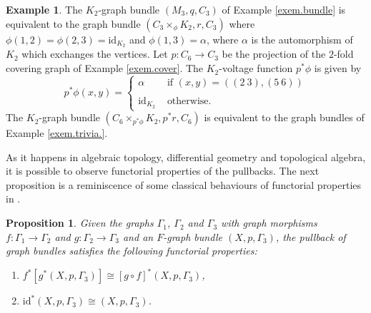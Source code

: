 \documentclass{amsart}
\newtheorem{prop}[theo]{Proposition}
\theoremstyle{definition}
\newtheorem{example}[theo]{Example}
\numberwithin{equation}{section}
\begin{document}
\begin{example}\label{exem.pullb}
The $K_2$-graph bundle $(M_3, q, C_3)$  of Example \ref{exem.bundle} is equivalent to the graph bundle $(C_3 \times_\phi K_2, r, C_3)$ where $\phi(1,2) = \phi(2,3) = \mathrm{id}_{K_2}$ and $\phi(1,3) = \alpha$, where $\alpha$ is the automorphism of $K_2$ which exchanges the vertices. Let $p : C_6 \longrightarrow C_3$ be the projection of the $2$-fold covering graph of Example \ref{exem.cover}. The $K_2$-voltage function $p^*\phi$ is given by
\begin{equation}
    p^*\phi(x,y) = \begin{cases}
        \alpha & \mbox{   if   } (x,y) = ((2  \ 3) , (5 \ 6)) \\
        \\
        \mathrm{id}_{K_2} & \mbox{ otherwise.}
    \end{cases}
\end{equation}
The $K_2$-graph bundle $(C_6 \times_{p^* \phi} K_2, p^* r, C_6)$ is equivalent to the graph bundles of Example \ref{exem.trivia.}.
\end{example}



As it happens in algebraic topology, differential geometry and topological algebra, it is possible to observe  functorial properties of the pullbacks. The next proposition is a reminiscence of some classical behaviours of functorial properties in \cite[Propositions A3.33, A3.35, A3.36, Theorems A3.52, Lemma A3.59, Theorem A3.60]{hofmor}.

\begin{prop}\label{funct}
Given the  graphs $\Gamma_1$, $\Gamma_2$ and $\Gamma_3$ with graph morphisms $f: \Gamma_1 \longrightarrow \Gamma_2$ and $g: \Gamma_2 \longrightarrow \Gamma_3$ and  an $F$-graph bundle $(X, p, \Gamma_3)$, the pullback of graph bundles satisfies the following functorial properties: 
\begin{enumerate}
    \item[{\rm (1).}] $f^*[g^*(X, p, \Gamma_3)] \cong [g \circ f]^*(X, p, \Gamma_3)$,
    \item[{\rm (2).}] $\mathrm{id}^*(X, p, \Gamma_3) \cong (X, p, \Gamma_3)$.
\end{enumerate}
\end{prop}
\end{document}
